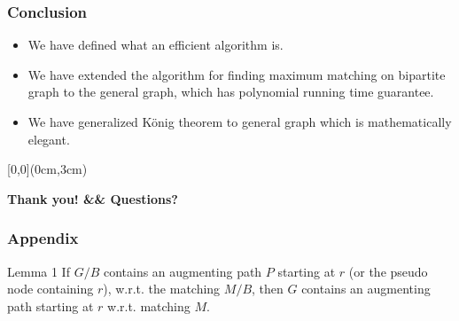 \documentclass[hyperref={pdfpagelabels=false}]{beamer}
\begin{document}
\frame
{
	\frametitle{Conclusion}
	\begin{itemize}
		\item<1-> We have defined what an efficient algorithm is.
		\item<2-> We have extended the algorithm for finding maximum matching on bipartite graph to the general graph, which has polynomial running time guarantee.
		\item<3-> We have generalized K\"{o}nig theorem to general graph which is mathematically elegant.
	\end{itemize}
}

{
\begin{frame}
	\begin{textblock*}{\paperwidth}[0,0](0cm,3cm)
		\begin{center}
			\textbf{\huge {Thank you! \&\& Questions?}}
		\end{center}
	\end{textblock*}
\end{frame}
}

\frame
{
	\frametitle{Appendix}
	
	\begin{block}{Lemma 1}
	If $G/B$ contains an augmenting path $P$ starting at $r$ (or the pseudo node containing $r$), w.r.t. the matching $M/B$, then $G$ contains an augmenting path starting at $r$ w.r.t. matching $M$.
	\end{block}
	
}
\end{document}
